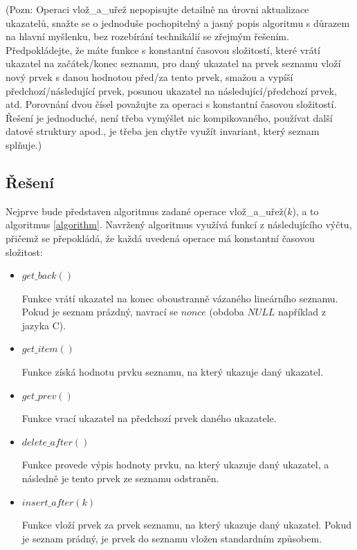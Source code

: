 \documentclass[a4paper, 12pt]{article}
\theoremstyle{definition}
\theoremstyle{definition}
\theoremstyle{definition}
\theoremstyle{remark}
\theoremstyle{remark}
\theoremstyle{remark}
\theoremstyle{remark}
\begin{document}
\vspace{0.25cm}

\noindent
{\footnotesize (Pozn: Operaci {\selectfont vlož\_a\_uřež} nepopisujte detailně na úrovni aktualizace ukazatelů, snažte se o jednoduše pochopitelný a jasný popis algoritmu s důrazem na hlavní myšlenku, bez rozebírání technikálií se zřejmým řešením. Předpokládejte, že máte funkce s konstantní časovou složitostí, které vrátí ukazatel na začátek/konec seznamu, pro daný ukazatel na prvek seznamu vloží nový prvek s danou hodnotou před/za tento prvek, smažou a vypíší předchozí/následující prvek, posunou ukazatel na následující/předchozí prvek, atd. Porovnání dvou čísel považujte za operaci s konstantní časovou složitostí. Řešení je jednoduché, není třeba vymýšlet nic kompikovaného, používat další datové struktury apod., je třeba jen chytře využít invariant, který seznam splňuje.)}

\subsection{Řešení}
Nejprve bude představen algoritmus zadané operace {\selectfont vlož\_a\_uřež}($k$), a to algoritmus \ref{algorithm}. Navržený algoritmus využívá funkcí z následujícího výčtu, přičemž se přepokládá, že každá uvedená operace má konstantní časovou složitost:

\begin{itemize}
    \item $get\_back()$

    Funkce vrátí ukazatel na konec oboustranně vázaného lineárního seznamu. Pokud je seznam prázdný, navrací se $nonce$ (obdoba $NULL$ například z jazyka C).
    \item $get\_item()$

    Funkce získá hodnotu prvku seznamu, na který ukazuje daný ukazatel.
    \item $get\_prev()$

    Funkce vrací ukazatel na předchozí prvek daného ukazatele.
    \item $delete\_after()$

    Funkce provede výpis hodnoty prvku, na který ukazuje daný ukazatel, a následně je tento prvek ze seznamu odstraněn.
    \item $insert\_after(k)$

    Funkce vloží prvek za prvek seznamu, na který ukazuje daný ukazatel. Pokud je seznam prádný, je prvek do seznamu vložen standardním způsobem.
\end{itemize}
\end{document}
